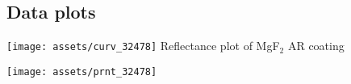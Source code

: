 \documentclass{article}
\begin{document}
\begin{multicols}{2}
\section{Data plots}

\begin{center}
\texttt{[image: assets/curv\_32478]}
Reflectance plot of MgF$_{2}$ AR coating
\end{center}


\end{multicols}

\begin{center}
\texttt{[image: assets/prnt\_32478]}
\end{center}
\end{document}
